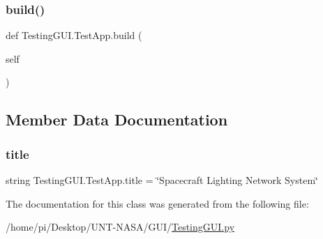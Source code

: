 \mbox{\label{classTestingGUI_1_1TestApp_ae400da04ab73e37a37943e36a1a90fd7}} 
\subsubsection{\texorpdfstring{build()}{build()}\hspace{0.1cm}{\footnotesize\ttfamily [2/2]}}
{\footnotesize\ttfamily def Testing\+G\+U\+I.\+Test\+App.\+build (\begin{DoxyParamCaption}\item[{}]{self }\end{DoxyParamCaption})}



\subsection{Member Data Documentation}
\mbox{\label{classTestingGUI_1_1TestApp_a8ed3f749511e756286c7216e71665c65}} 
\subsubsection{\texorpdfstring{title}{title}}
{\footnotesize\ttfamily string Testing\+G\+U\+I.\+Test\+App.\+title = \char`\"{}Spacecraft Lighting Network System\char`\"{}\hspace{0.3cm}{\ttfamily [static]}}



The documentation for this class was generated from the following file\+:\begin{DoxyCompactItemize}
\item 
/home/pi/\+Desktop/\+U\+N\+T-\/\+N\+A\+S\+A/\+G\+U\+I/\hyperlink{GUI_2TestingGUI_8py}{Testing\+G\+U\+I.\+py}\end{DoxyCompactItemize}
